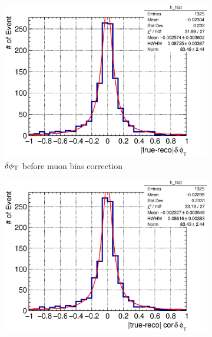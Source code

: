 \begin{figure}
\begin{subfigure}[b]{\dbfigwid\textwidth}
               \label{subfig:esc-dalpha-afmu-sfgmu}
          \end{subfigure}
          \\
          \begin{subfigure}[b]{\dbfigwid\textwidth}
               \centering
               \includegraphics[width=\textwidth]{figures/perf/tki/dphit_rat_hist_al11_sfgmu.eps}
               \caption{$\delta\phi_\textrm{T}$ before muon bias correction}
               \label{subfig:esc-dphit-bfmu-sfgmu}
          \end{subfigure}
          \begin{subfigure}[b]{\dbfigwid\textwidth}
               \centering
               \includegraphics[width=\textwidth]{figures/perf/tki/cor_dphit_rat_hist_al11_sfgmu.eps}

\end{subfigure}
\end{figure}
